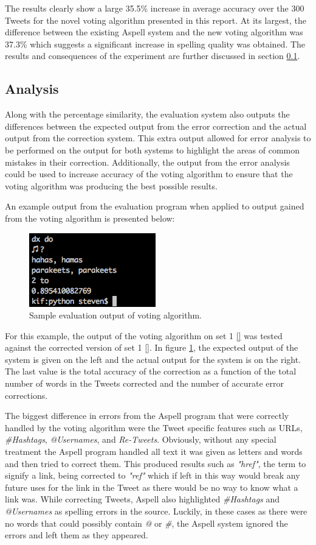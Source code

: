 The results clearly show a large 35.5\% increase in average accuracy over the 300 Tweets for the novel voting algorithm presented in this report. At its largest, the difference between the existing Aspell system and the new voting algorithm was 37.3\% which suggests a significant increase in spelling quality was obtained. The results and consequences of the experiment are further discussed in section \ref{analysisT}.

\subsection{Analysis}
\label{analysisT}
Along with the percentage similarity, the evaluation system also outputs the differences between the expected output from the error correction and the actual output from the correction system. This extra output allowed for error analysis to be performed on the output for both systems to highlight the areas of common mistakes in their correction. Additionally, the output from the error analysis could be used to increase accuracy of the voting algorithm to ensure that the voting algorithm was producing the best possible results.

An example output from the evaluation program when applied to output gained from the voting algorithm is presented below:
\begin{figure}[!h]
	\centering
	\label{fig:output}
	\includegraphics{images/sampleoutput}
	\caption{Sample evaluation output of voting algorithm.}
\end{figure}

For this example, the output of the voting algorithm on set 1 \ref{} was tested against the corrected version of set 1 \ref{}. In figure \ref{fig:output}, the expected output of the system is given on the left and the actual output for the system is on the right. The last value is the total accuracy of the correction as a function of the total number of words in the Tweets corrected and the number of accurate error corrections.

The biggest difference in errors from the Aspell program that were correctly handled by the voting algorithm were the Tweet specific features such as URLs, \emph{#Hashtags}, \emph{@Usernames}, and \emph{Re-Tweets}. Obviously, without any special treatment the Aspell program handled all text it was given as letters and words and then tried to correct them. This produced results such as \emph{"href"}, the term to signify a link, being corrected to \emph{"ref"} which if left in this way would break any future uses for the link in the Tweet as there would be no way to know what a link was. While correcting Tweets, Aspell also highlighted \emph{\#Hashtags} and \emph{@Usernames} as spelling errors in the source. Luckily, in these cases as there were no words that could possibly contain \emph{@} or \emph{\#}, the Aspell system ignored the errors and left them as they appeared.


